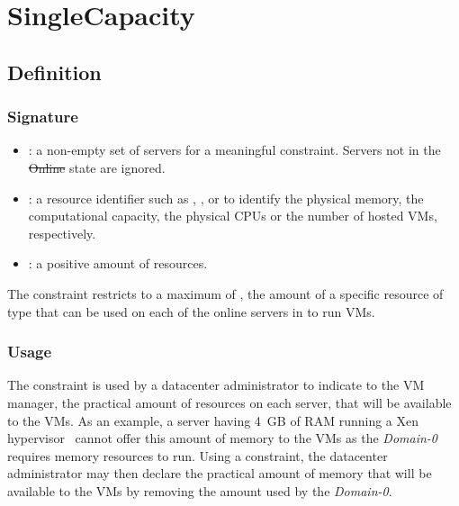 \section{SingleCapacity}

\subsection{Definition}

\subsubsection{Signature} 

\begin{itemize}
\item {}: a non-empty set of servers for a meaningful constraint. Servers not in the \st{Online}
state are ignored.
\item {} : a resource identifier such as , ,  or  to identify the physical memory,
the computational capacity, the physical CPUs or the number of hosted VMs, respectively.
\item {}: a positive amount of resources.
\end{itemize}


The  constraint restricts to a maximum of , the amount
of a specific resource of type  that can be used on each of the online servers
in  to run VMs.


\subsubsection{Usage}

The  constraint is used by a datacenter administrator to indicate to the VM manager,
the practical amount of resources on each server, that will be available to the VMs.
As an example, a server having 4~GB of RAM running a Xen hypervisor~\cite{xen-sosp03} cannot offer this
amount of memory to the VMs as the \emph{Domain-0} requires memory resources to run. Using a  constraint, the datacenter administrator may then declare the practical amount of memory that will be available to the VMs by removing the amount used by the \emph{Domain-0}.

